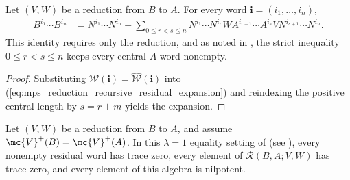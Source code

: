 \begin{lemma}
    \label{thm:mps_reduction_residual_expansion}
    \leanok
    Let $(V,W)$ be a reduction from $B$ to $A$.  For every word
    $\mathbf i=(i_1,\ldots,i_n)$,
    \begin{align}
        B^{i_1}\cdots B^{i_n}
         & =N^{i_1}\cdots N^{i_n}
        +\sum_{0\leq r<s\leq n}
        N^{i_1}\cdots N^{i_r}
        W A^{i_{r+1}}\cdots A^{i_s}V
        N^{i_{s+1}}\cdots N^{i_n}.
        \label{eq:mps_reduction_residual_expansion}
    \end{align}
    This identity requires only the reduction, and as noted in
    \cite{gap:mgsc18_residual_expansion_empty_word_error}, the strict
    inequality $0\leq r<s\leq n$ keeps every central $A$-word nonempty.
\end{lemma}

\begin{proof}
    \leanok
    Substituting
    $\mathcal W(\mathbf i)=\widehat{\mathcal W}(\mathbf i)$ into
    (\ref{eq:mps_reduction_recursive_residual_expansion}) and reindexing
    the positive central length by $s=r+m$ yields the expansion.
\end{proof}

\begin{lemma}
    \label{thm:mps_reduction_residual_algebra_nilpotent}
    \leanok
    Let $(V,W)$ be a reduction from $B$ to $A$, and assume
    $\mc{V}^+(B)=\mc{V}^+(A)$.  In this $\lambda=1$ equality setting of
    \cite[Proposition~21]{Molnar2018SemiInjective} (see
    \cite{gap:mgsc18_reduction_proportionality_scalar}), every nonempty
    residual word has trace zero, every element of $\mathcal R(B,A;V,W)$ has
    trace zero, and every element of this algebra is nilpotent.
\end{lemma}

